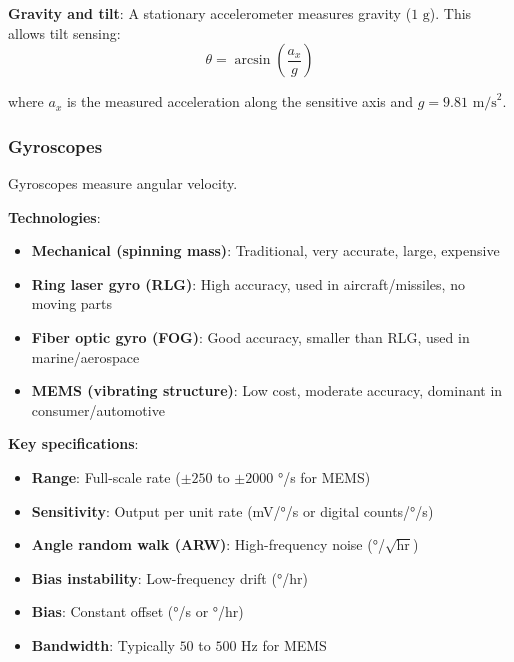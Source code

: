 \textbf{Gravity and tilt}: A stationary accelerometer measures gravity ($1\text{ g}$). This allows tilt sensing:
\begin{equation}
\theta = \arcsin\left(\frac{a_x}{g}\right)
\label{eq:tilt_from_accel}
\end{equation}

where $a_x$ is the measured acceleration along the sensitive axis and $g = 9.81\text{ m/s}^2$.


\subsubsection{Gyroscopes}

Gyroscopes measure angular velocity.

\textbf{Technologies}:
\begin{itemize}
    \item \textbf{Mechanical (spinning mass)}: Traditional, very accurate, large, expensive
    \item \textbf{Ring laser gyro (RLG)}: High accuracy, used in aircraft/missiles, no moving parts
    \item \textbf{Fiber optic gyro (FOG)}: Good accuracy, smaller than RLG, used in marine/aerospace
    \item \textbf{MEMS (vibrating structure)}: Low cost, moderate accuracy, dominant in consumer/automotive
\end{itemize}

\textbf{Key specifications}:
\begin{itemize}
    \item \textbf{Range}: Full-scale rate ($\pm 250$ to $\pm 2000$ °/s for MEMS)
    \item \textbf{Sensitivity}: Output per unit rate (mV/°/s or digital counts/°/s)
    \item \textbf{Angle random walk (ARW)}: High-frequency noise (°/$\sqrt{\text{hr}}$)
    \item \textbf{Bias instability}: Low-frequency drift (°/hr)
    \item \textbf{Bias}: Constant offset (°/s or °/hr)
    \item \textbf{Bandwidth}: Typically $50$ to $500\text{ Hz}$ for MEMS
\end{itemize}

